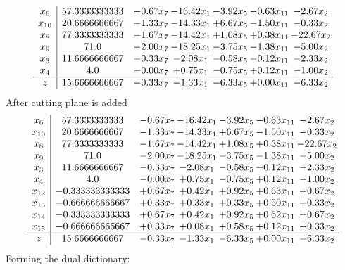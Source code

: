 \documentclass[8pt]{article}
\begin{document}
\[\begin{array}{c| c c@{\hskip 2pt} c@{\hskip 2pt} c@{\hskip 2pt} c@{\hskip 2pt} c@{\hskip 2pt} }
 x_{6}   &  57.3333333333 & -0.67 x_{7} & -16.42 x_{1} & -3.92 x_{5} & -0.63 x_{11} & -2.67 x_{2}\\
 x_{10}   &  20.6666666667 & -1.33 x_{7} & -14.33 x_{1} & +  6.67 x_{5} & -1.50 x_{11} & -0.33 x_{2}\\
 x_{8}   &  77.3333333333 & -1.67 x_{7} & -14.42 x_{1} & +  1.08 x_{5} & +  0.38 x_{11} & -22.67 x_{2}\\
 x_{9}   &  71.0 & -2.00 x_{7} & -18.25 x_{1} & -3.75 x_{5} & -1.38 x_{11} & -5.00 x_{2}\\
 x_{3}   &  11.6666666667 & -0.33 x_{7} & -2.08 x_{1} & -0.58 x_{5} & -0.12 x_{11} & -2.33 x_{2}\\
 x_{4}   &  4.0 & -0.00 x_{7} & +  0.75 x_{1} & -0.75 x_{5} & +  0.12 x_{11} & -1.00 x_{2}\\
\hline
z    &  15.6666666667 & -0.33 x_{7} & -1.33 x_{1} & -6.33 x_{5} & +  0.00 x_{11} & -6.33 x_{2}\\
\end{array}\]
 After cutting plane is added 
\[\begin{array}{c| c c@{\hskip 2pt} c@{\hskip 2pt} c@{\hskip 2pt} c@{\hskip 2pt} c@{\hskip 2pt} }
 x_{6}   &  57.3333333333 & -0.67 x_{7} & -16.42 x_{1} & -3.92 x_{5} & -0.63 x_{11} & -2.67 x_{2}\\
 x_{10}   &  20.6666666667 & -1.33 x_{7} & -14.33 x_{1} & +  6.67 x_{5} & -1.50 x_{11} & -0.33 x_{2}\\
 x_{8}   &  77.3333333333 & -1.67 x_{7} & -14.42 x_{1} & +  1.08 x_{5} & +  0.38 x_{11} & -22.67 x_{2}\\
 x_{9}   &  71.0 & -2.00 x_{7} & -18.25 x_{1} & -3.75 x_{5} & -1.38 x_{11} & -5.00 x_{2}\\
 x_{3}   &  11.6666666667 & -0.33 x_{7} & -2.08 x_{1} & -0.58 x_{5} & -0.12 x_{11} & -2.33 x_{2}\\
 x_{4}   &  4.0 & -0.00 x_{7} & +  0.75 x_{1} & -0.75 x_{5} & +  0.12 x_{11} & -1.00 x_{2}\\
 x_{12}   &  -0.333333333333 & +  0.67 x_{7} & +  0.42 x_{1} & +  0.92 x_{5} & +  0.63 x_{11} & +  0.67 x_{2}\\
 x_{13}   &  -0.666666666667 & +  0.33 x_{7} & +  0.33 x_{1} & +  0.33 x_{5} & +  0.50 x_{11} & +  0.33 x_{2}\\
 x_{14}   &  -0.333333333333 & +  0.67 x_{7} & +  0.42 x_{1} & +  0.92 x_{5} & +  0.62 x_{11} & +  0.67 x_{2}\\
 x_{15}   &  -0.666666666667 & +  0.33 x_{7} & +  0.08 x_{1} & +  0.58 x_{5} & +  0.12 x_{11} & +  0.33 x_{2}\\
\hline
z    &  15.6666666667 & -0.33 x_{7} & -1.33 x_{1} & -6.33 x_{5} & +  0.00 x_{11} & -6.33 x_{2}\\
\end{array}\]
Forming the dual dictionary:
\end{document}
